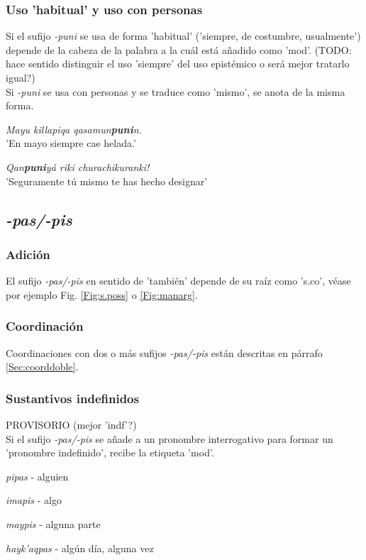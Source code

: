 \documentclass[a4paper,11pt,DIV12]{scrartcl}
\begin{document}
\subsubsection{Uso 'habitual' y uso con personas}
Si el sufijo {\em -puni} se usa de forma 'habitual' ('siempre, de costumbre, usualmente') depende de la cabeza de la palabra a la cu\'al est\'a a\~nadido como 'mod'. (TODO: hace sentido distinguir el uso 'siempre' del uso epist\'emico o ser\'a mejor tratarlo igual?)\\
Si {\em -puni} se usa con personas y se traduce como 'mismo', se anota de la misma forma.

\begin{examples}
 \item {\em Mayu killapiqa qasamun\textbf{puni}n.}\\
	'En mayo siempre cae helada.'
 \item {\em Qan\textbf{puni}y\'a riki churachikuranki!}\\
	'Seguramente t\'u mismo te has hecho designar'\\
      		\hfill{\small \citep[244]{Cusi2}}
\end{examples}


 \subsection{{\em-pas/-pis}}
\subsubsection{Adici\'on}
 El sufijo {\em -pas/-pis} en sentido de 'tambi\'en' depende de su ra\'iz como 's.co', v\'ease por ejemplo Fig. \ref{Fig:s.poss} o \ref{Fig:manarg}.
\subsubsection{Coordinaci\'on}
Coordinaciones con dos o m\'as sufijos {\em -pas/-pis} est\'an descritas en p\'arrafo \ref{Sec:coorddoble}.
 \subsubsection{Sustantivos indefinidos}
 PROVISORIO (mejor 'indf'?) \\
Si el sufijo {\em -pas/-pis} se a\~nade a un pronombre interrogativo para formar un 'pronombre indefinido', recibe la etiqueta 'mod'.
\begin{examples}
 \item {\em pipas} - alguien
  \item {\em imapis} - algo
 \item {\em maypis} - alguna parte
\item {\em hayk'aqpas} - alg\'un d\'ia, alguna vez
\end{examples}
\end{document}
